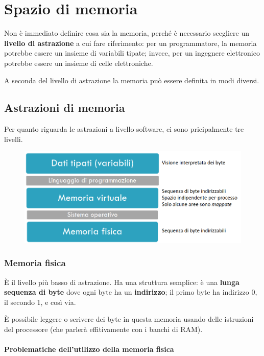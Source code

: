 \chapter{Spazio di memoria}

Non è immediato definire cosa sia la memoria, perché è necessario scegliere un
\textbf{livello di astrazione} a cui fare riferimento: per un programmatore, la memoria potrebbe essere un insieme di variabili tipate;
invece, per un ingegnere elettronico potrebbe essere un insieme di celle elettroniche.

A seconda del livello di astrazione la memoria può essere definita in modi diversi.

\section{Astrazioni di memoria}

Per quanto riguarda le astrazioni a livello software, ci sono pricipalmente tre livelli.

\begin{figure}[ht]
    \centering
    \includegraphics[width=0.75\linewidth]{images/astrazioni.png}
\end{figure}

\subsection{Memoria fisica}

È il livello più basso di astrazione. Ha una struttura semplice: è una \textbf{lunga
sequenza di byte} dove ogni byte ha un \textbf{indirizzo};
il primo byte ha indirizzo 0, il secondo 1, e così via.

È possibile leggere o scrivere dei byte in questa memoria usando delle istruzioni del processore (che parlerà effitivamente con
i banchi di RAM).

\subsubsection{Problematiche dell'utilizzo della memoria fisica}

